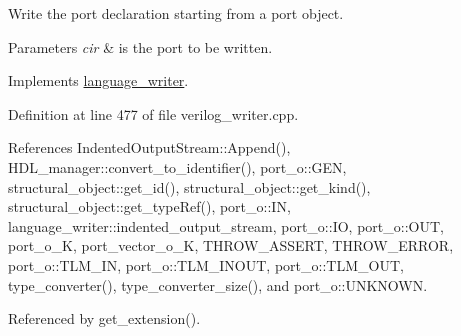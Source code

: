 Write the port declaration starting from a port object. 


\begin{DoxyParams}{Parameters}
{\em cir} & is the port to be written. \\
\hline
\end{DoxyParams}


Implements \hyperlink{classlanguage__writer_acf6d294fc4f807691e729b0dd13bc998}{language\+\_\+writer}.



Definition at line 477 of file verilog\+\_\+writer.\+cpp.



References Indented\+Output\+Stream\+::\+Append(), H\+D\+L\+\_\+manager\+::convert\+\_\+to\+\_\+identifier(), port\+\_\+o\+::\+G\+EN, structural\+\_\+object\+::get\+\_\+id(), structural\+\_\+object\+::get\+\_\+kind(), structural\+\_\+object\+::get\+\_\+type\+Ref(), port\+\_\+o\+::\+IN, language\+\_\+writer\+::indented\+\_\+output\+\_\+stream, port\+\_\+o\+::\+IO, port\+\_\+o\+::\+O\+UT, port\+\_\+o\+\_\+K, port\+\_\+vector\+\_\+o\+\_\+K, T\+H\+R\+O\+W\+\_\+\+A\+S\+S\+E\+RT, T\+H\+R\+O\+W\+\_\+\+E\+R\+R\+OR, port\+\_\+o\+::\+T\+L\+M\+\_\+\+IN, port\+\_\+o\+::\+T\+L\+M\+\_\+\+I\+N\+O\+UT, port\+\_\+o\+::\+T\+L\+M\+\_\+\+O\+UT, type\+\_\+converter(), type\+\_\+converter\+\_\+size(), and port\+\_\+o\+::\+U\+N\+K\+N\+O\+WN.



Referenced by get\+\_\+extension().

